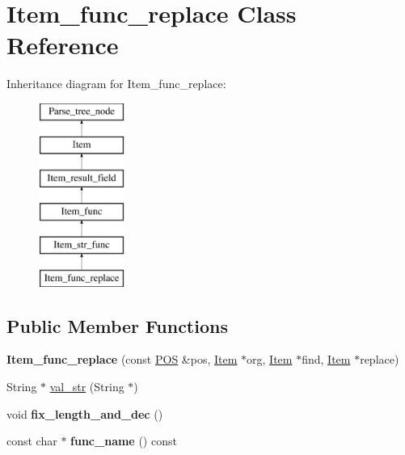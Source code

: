 \hypertarget{classItem__func__replace}{}\section{Item\+\_\+func\+\_\+replace Class Reference}
\label{classItem__func__replace}
Inheritance diagram for Item\+\_\+func\+\_\+replace\+:\begin{figure}[H]
\begin{center}
\leavevmode
\includegraphics[height=6.000000cm]{classItem__func__replace}
\end{center}
\end{figure}
\subsection*{Public Member Functions}
\begin{DoxyCompactItemize}
\item 
\mbox{\label{classItem__func__replace_ac582855253b582f6183249ae1a85a1f4}} 
{\bfseries Item\+\_\+func\+\_\+replace} (const \mbox{\hyperlink{structYYLTYPE}{P\+OS}} \&pos, \mbox{\hyperlink{classItem}{Item}} $\ast$org, \mbox{\hyperlink{classItem}{Item}} $\ast$find, \mbox{\hyperlink{classItem}{Item}} $\ast$replace)
\item 
String $\ast$ \mbox{\hyperlink{classItem__func__replace_a339fa98601454ef99451c1c2daf5d1a4}{val\+\_\+str}} (String $\ast$)
\item 
\mbox{\label{classItem__func__replace_a5bda94558b8984f22efb8cf51c44cded}} 
void {\bfseries fix\+\_\+length\+\_\+and\+\_\+dec} ()
\item 
\mbox{\label{classItem__func__replace_a0ca127a831b6c7c6360b611922b1f3f7}} 
const char $\ast$ {\bfseries func\+\_\+name} () const
\end{DoxyCompactItemize}

